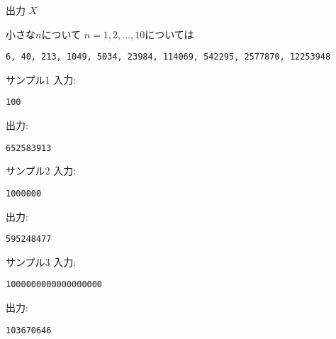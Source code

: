 \documentclass[a4paper,twoside,onecolumn,openany,article,10pt]{memoir}
\theoremstyle{remark}
\begin{document}
\begin{itembox}[l]{出力}
$X$
\end{itembox}

\begin{itembox}[l]{小さな$n$について}
$n=1,2,\dotsc,10$については
\begin{verbatim}
6, 40, 213, 1049, 5034, 23984, 114069, 542295, 2577870, 12253948
\end{verbatim}
\end{itembox}

\noindent
\begin{minipage}[t]{0.33\hsize}
\begin{itembox}[l]{サンプル1}
入力:
\begin{verbatim}
100
\end{verbatim}
出力:
\begin{verbatim}
652583913
\end{verbatim}
\end{itembox}
\end{minipage}
\begin{minipage}[t]{0.33\hsize}
\begin{itembox}[l]{サンプル2}
入力:
\begin{verbatim}
1000000
\end{verbatim}
出力:
\begin{verbatim}
595248477
\end{verbatim}
\end{itembox}
\end{minipage}
\begin{minipage}[t]{0.33\hsize}
\begin{itembox}[l]{サンプル3}
入力:
\begin{verbatim}
1000000000000000000
\end{verbatim}
出力:
\begin{verbatim}
103670646
\end{verbatim}
\end{itembox}
\end{minipage}
\end{document}
